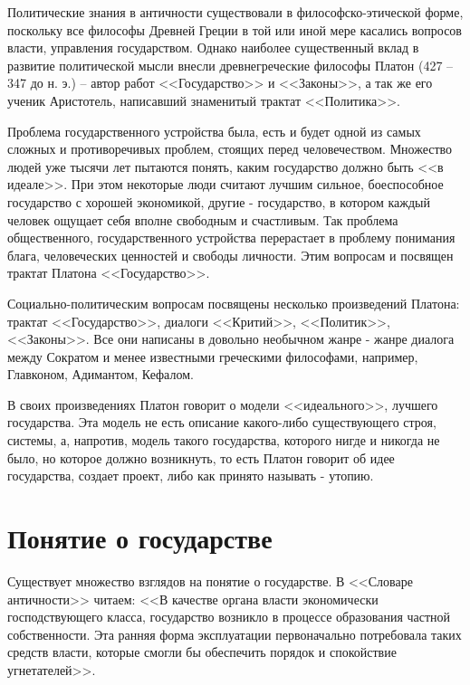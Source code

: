 	Политические знания в античности существовали в философско-этической форме, 
	поскольку все философы Древней Греции в той или иной мере касались вопросов 
	власти, управления государством. Однако наиболее существенный вклад в 
	развитие политической мысли внесли древнегреческие философы Платон 
	(427 --347 до н. э.) -- автор работ <<Государство>> и <<Законы>>, а так же 
	его ученик Аристотель, написавший знаменитый трактат <<Политика>>.

	Проблема государственного устройства была, есть и будет одной из самых сложных 
	и противоречивых проблем, стоящих перед человечеством. Множество людей уже 
	тысячи лет пытаются понять, каким государство должно быть <<в идеале>>. При этом 
	некоторые люди считают лучшим сильное, боеспособное государство с хорошей 
	экономикой, другие - государство, в котором каждый человек ощущает себя вполне 
	свободным и счастливым. Так проблема общественного, государственного устройства 
	перерастает в проблему понимания блага, человеческих ценностей и свободы 
	личности. Этим вопросам и посвящен трактат Платона <<Государство>>.

	Социально-политическим вопросам посвящены несколько произведений Платона: 
	трактат <<Государство>>, диалоги <<Критий>>, <<Политик>>, <<Законы>>. Все они 
	написаны в довольно необычном жанре - жанре диалога между Сократом и менее 
	известными греческими философами, например, Главконом, Адимантом, Кефалом. 

	В своих произведениях Платон говорит о модели <<идеального>>, лучшего 
	государства. Эта модель не есть описание какого-либо существующего строя, 
	системы, а, напротив, модель такого государства, которого нигде и никогда 
	не было, но которое должно возникнуть, то есть Платон говорит об идее 
	государства, создает проект, либо как принято называть - утопию.

\chapter{Понятие о государстве}
	Существует множество взглядов на понятие о государстве. В <<Словаре 
	античности>> читаем: <<В качестве органа власти экономически 
	господствующего класса, государство возникло в процессе образования 
	частной собственности. Эта ранняя форма эксплуатации первоначально 
	потребовала таких средств власти, которые смогли бы обеспечить порядок 
	и спокойствие угнетателей>>. 

